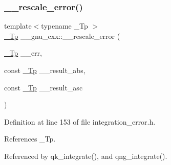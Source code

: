 \subsubsection{\texorpdfstring{\+\_\+\+\_\+rescale\+\_\+error()}{\_\_rescale\_error()}}
{\footnotesize\ttfamily template$<$typename \+\_\+\+Tp $>$ \\
\hyperlink{namespace____gnu__cxx_a3b19a9c800ca194374ef9172290f7d79}{\+\_\+\+Tp} \+\_\+\+\_\+gnu\+\_\+cxx\+::\+\_\+\+\_\+rescale\+\_\+error (\begin{DoxyParamCaption}\item[{\hyperlink{namespace____gnu__cxx_a3b19a9c800ca194374ef9172290f7d79}{\+\_\+\+Tp}}]{\+\_\+\+\_\+err,  }\item[{const \hyperlink{namespace____gnu__cxx_a3b19a9c800ca194374ef9172290f7d79}{\+\_\+\+Tp}}]{\+\_\+\+\_\+result\+\_\+abs,  }\item[{const \hyperlink{namespace____gnu__cxx_a3b19a9c800ca194374ef9172290f7d79}{\+\_\+\+Tp}}]{\+\_\+\+\_\+result\+\_\+asc }\end{DoxyParamCaption})}



Definition at line 153 of file integration\+\_\+error.\+h.



References \+\_\+\+Tp.



Referenced by qk\+\_\+integrate(), and qng\+\_\+integrate().


